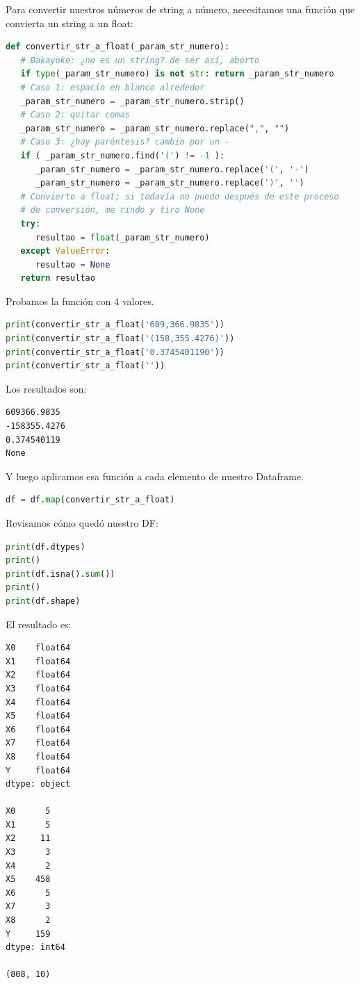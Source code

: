 \documentclass[spanish,oneside]{book} %
\begin{document}
Para convertir nuestros números de string a número, necesitamos una función que convierta un string a un float:

\begin{lstlisting}[language=Python]
def convertir_str_a_float(_param_str_numero):
   # Bakayoke: ¿no es un string? de ser así, aborto
   if type(_param_str_numero) is not str: return _param_str_numero
   # Caso 1: espacio en blanco alrededor
   _param_str_numero = _param_str_numero.strip()
   # Caso 2: quitar comas
   _param_str_numero = _param_str_numero.replace(",", "")
   # Caso 3: ¿hay paréntesis? cambio por un -
   if ( _param_str_numero.find('(') != -1 ):
      _param_str_numero = _param_str_numero.replace('(', '-')
      _param_str_numero = _param_str_numero.replace(')', '')
   # Convierto a float; si todavía no puedo después de este proceso
   # de conversión, me rindo y tiro None
   try:
      resultao = float(_param_str_numero)
   except ValueError:
      resultao = None
   return resultao
\end{lstlisting}

Probamos la función con 4 valores.

\begin{lstlisting}[language=Python]
print(convertir_str_a_float('609,366.9835'))
print(convertir_str_a_float('(158,355.4276)'))
print(convertir_str_a_float('0.3745401190'))
print(convertir_str_a_float(''))
\end{lstlisting}

Los resultados son:

\begin{lstlisting}
609366.9835
-158355.4276
0.374540119
None
\end{lstlisting}

Y luego aplicamos esa función a cada elemento de nuestro Dataframe.

\begin{lstlisting}[language=Python]
df = df.map(convertir_str_a_float)
\end{lstlisting}

Revisamos cómo quedó nuestro DF:

\begin{lstlisting}[language=Python]
print(df.dtypes)
print()
print(df.isna().sum())
print()
print(df.shape)
\end{lstlisting}

El resultado es:

\begin{lstlisting}
X0    float64
X1    float64
X2    float64
X3    float64
X4    float64
X5    float64
X6    float64
X7    float64
X8    float64
Y     float64
dtype: object

X0      5
X1      5
X2     11
X3      3
X4      2
X5    458
X6      5
X7      3
X8      2
Y     159
dtype: int64

(808, 10)
\end{lstlisting}
\end{document}

